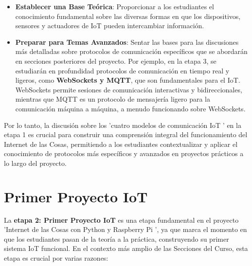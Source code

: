 \documentclass{report}
\begin{document}
\begin{itemize}
    \item \textbf{Establecer una Base Teórica}: Proporcionar a los estudiantes el conocimiento fundamental sobre las diversas formas en que los dispositivos, 
    sensores y actuadores de IoT pueden intercambiar información.
    \item \textbf{Preparar para Temas Avanzados}: Sentar las bases para las discusiones más detalladas sobre protocolos de comunicación específicos que se 
    abordarán en secciones posteriores del proyecto. Por ejemplo, en la etapa 3, se estudiarán en profundidad protocolos de comunicación en tiempo real y 
    ligeros, como \textbf{WebSockets y MQTT}, que son fundamentales para el IoT. WebSockets permite sesiones de comunicación interactivas y bidireccionales, 
    mientras que MQTT es un protocolo de mensajería ligero para la comunicación máquina a máquina, a menudo funcionando sobre WebSockets.
\end{itemize}
Por lo tanto, la discusión sobre los  'cuatro modelos de comunicación IoT ' en la etapa 1 es crucial para construir una comprensión integral del 
funcionamiento del Internet de las Cosas, permitiendo a los estudiantes contextualizar y aplicar el conocimiento de protocolos más específicos y avanzados 
en proyectos prácticos a lo largo del proyecto.

\section{Primer Proyecto IoT}
La \textbf{etapa 2: Primer Proyecto IoT} es una etapa fundamental en el proyecto  'Internet de las Cosas con Python y Raspberry Pi ', ya que marca el 
momento en que los estudiantes pasan de la teoría a la práctica, construyendo su primer sistema IoT funcional. En el contexto más amplio de las Secciones 
del Curso, esta etapa es crucial por varias razones:
\end{document}
